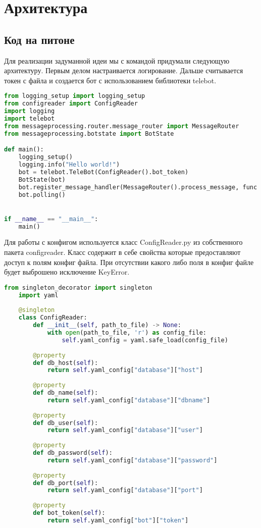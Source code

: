 \documentclass[12pt]{extarticle}
\begin{document}
\pagebreak

\section{Архитектура}
\subsection{Код на питоне}

Для реализации задуманной идеи мы с командой придумали следующую архитектуру. Первым делом настраивается логирование. Дальше считывается токен с файла и создается бот с использованием библиотеки telebot.
\begin{lstlisting}[language=Python,style=mystyle,caption=main.py]
from logging_setup import logging_setup
from configreader import ConfigReader
import logging
import telebot
from messageprocessing.router.message_router import MessageRouter
from messageprocessing.botstate import BotState

def main():
    logging_setup()
    logging.info("Hello world!")
    bot = telebot.TeleBot(ConfigReader().bot_token)
    BotState(bot)
    bot.register_message_handler(MessageRouter().process_message, func = lambda x: True)
    bot.polling()


if __name__ == "__main__":
    main()
\end{lstlisting}


Для работы с конфигом используется класс ConfigReader.py из собственного пакета configreader. Класс содержит в себе свойства которые предоставляют доступ к полям конфиг файла. При отсутствии какого либо поля в конфиг файле будет выброшено исключение KeyError.
\begin{lstlisting}[language=Python,style=mystyle,caption=ConfigReader.py]
    from singleton_decorator import singleton
    import yaml
    
    @singleton
    class ConfigReader:
        def __init__(self, path_to_file) -> None:
            with open(path_to_file, 'r') as config_file:
                self.yaml_config = yaml.safe_load(config_file)
    
        @property
        def db_host(self):
            return self.yaml_config["database"]["host"]
        
        @property
        def db_name(self):
            return self.yaml_config["database"]["dbname"]
        
        @property
        def db_user(self):
            return self.yaml_config["database"]["user"]
        
        @property
        def db_password(self):
            return self.yaml_config["database"]["password"]
        
        @property
        def db_port(self):
            return self.yaml_config["database"]["port"]
        
        @property
        def bot_token(self):
            return self.yaml_config["bot"]["token"]
    
\end{lstlisting}
\end{document}
